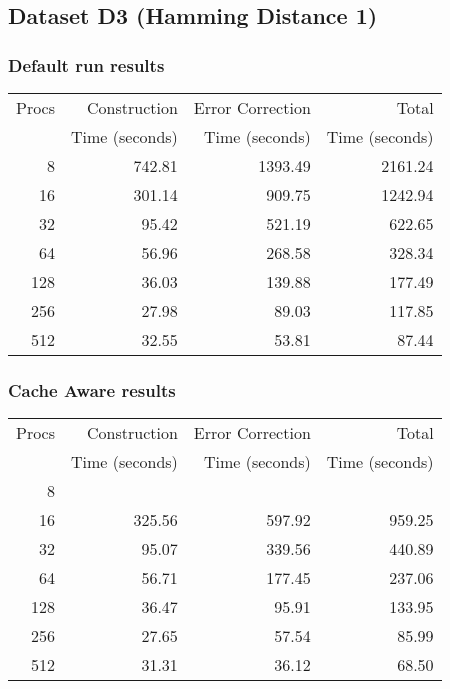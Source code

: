 \documentclass[integrals, nointegrals, article, 12pt, a4paper]{article}
\begin{document}
\subsection{Dataset D3 (Hamming Distance 1)}
\label{sec-3-4}
\subsubsection{Default run results}
\label{sec-3-4-1}

\begin{center}
\begin{tabular}{rrrr}
\hline
Procs & Construction & Error Correction & Total\\
 & Time (seconds) & Time (seconds) & Time (seconds)\\
\hline
8 & 742.81 & 1393.49 & 2161.24\\
16 & 301.14 & 909.75 & 1242.94\\
32 & 95.42 & 521.19 & 622.65\\
64 & 56.96 & 268.58 & 328.34\\
128 & 36.03 & 139.88 & 177.49\\
256 & 27.98 & 89.03 & 117.85\\
512 & 32.55 & 53.81 & 87.44\\
\hline
\end{tabular}
\end{center}

\subsubsection{Cache Aware results}
\label{sec-3-4-2}

\begin{center}
\begin{tabular}{rrrr}
\hline
Procs & Construction & Error Correction & Total\\
 & Time (seconds) & Time (seconds) & Time (seconds)\\
\hline
8 &  &  & \\
16 & 325.56 & 597.92 & 959.25\\
32 & 95.07 & 339.56 & 440.89\\
64 & 56.71 & 177.45 & 237.06\\
128 & 36.47 & 95.91 & 133.95\\
256 & 27.65 & 57.54 & 85.99\\
512 & 31.31 & 36.12 & 68.50\\
\hline
\end{tabular}
\end{center}
\end{document}
